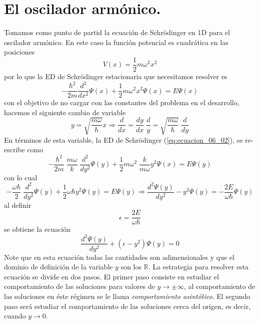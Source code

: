 \section*{El oscilador armónico.}
Tomamos como punto de partid la ecuación de Schrödinger en 1D para el oscilador armónico. En este caso la función potencial es cuadrática en las posiciones
\begin{equation}
V(x) =  \dfrac{1}{2} m \omega^{2} x^{2} 
\label{eq:ecuacion_06_01}
\end{equation}
por lo que la ED de Schrödinger estacionaria que necesitamos resolver es
\begin{equation}
- \dfrac{\hbar^{2}}{2m} \dfrac{d^{2}}{d x^{2}} \Psi(x) + \dfrac{1}{2} m \omega^{2} x^{2} \Psi(x) =  E \Psi(x)
\label{eq:ecuacion_06_02}
\end{equation}
con el objetivo de no cargar con las constantes del problema en el desarrollo, hacemos el siguiente cambio de variable
\begin{equation}
y = \sqrt{\dfrac{m \omega}{\hbar}} x \Rightarrow \dfrac{d}{dx} = \dfrac{d y}{d x} \; \dfrac{d}{y} = \sqrt{\dfrac{m \omega}{\hbar}} \; \dfrac{d}{dy}
\label{eq:ecuacion_06_03}
\end{equation}
En términos de esta variable, la ED de Schrödinger (\ref{eq:ecuacion_06_02}), se re-escribe como
\begin{equation}
- \dfrac{\hbar^{2}}{2m} \; \dfrac{m \omega}{k} \; \dfrac{d^{2}}{d y^{2}} \Psi(y) + \dfrac{1}{2} m \omega^{2} \; \dfrac{k}{m \omega} y^{2} \Psi(x) =  E \Psi(y)
\label{eq:ecuacion_06_05}
\end{equation}
con lo cual
\[ - \dfrac{\omega \hbar}{2} \; \dfrac{d^{2}}{d y^{2}} \Psi(y) + \dfrac{1}{2} \omega \hbar y^{2} \Psi(y) =  E \Psi(y) \Rightarrow \dfrac{d^{2} \Psi (y)}{d y^{2}} - y^{2} \Psi(y) = - \dfrac{2 E}{\omega \hbar} \Psi (y) \]
al definir
\[ \epsilon = \dfrac{2E}{\omega \hbar} \]
se obtiene la ecuación
\begin{equation}
\dfrac{d^{2} \Psi (y)}{d y^{2}} + (\epsilon - y^{2}) \Psi (y) = 0
\label{eq:ecuacion_06_06}
\end{equation}
Note que en esta ecuación todas las cantidades son adimensionales y que el dominio de definición de la variable $y$ son los $\mathbb{R}$. La estrategia para resolver esta ecuación se divide en dos pasos. El primer paso consiste en estudiar el comportamiento de las soluciones para valores de $y \to \pm \infty$, al comportamiento de las soluciones en éste régimen se le llama \emph{comportamiento asintótico}. El segundo paso será estudiar el comportamiento de las soluciones cerca del origen, es decir, cuando $y \to 0$.
